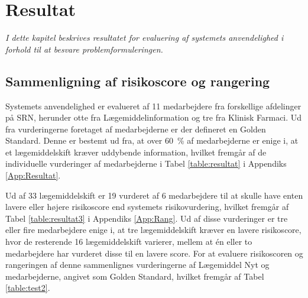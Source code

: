 \chapter{Resultat}
\textit{I dette kapitel beskrives resultatet for evaluering af systemets anvendelighed i forhold til at besvare problemformuleringen.}

\section{Sammenligning af risikoscore og rangering}
Systemets anvendelighed er evalueret af 11 medarbejdere fra forskellige afdelinger på SRN, herunder otte fra Lægemiddelinformation og tre fra Klinisk Farmaci. Ud fra vurderingerne foretaget af medarbejderne er der defineret en Golden Standard. Denne er bestemt ud fra, at over 60~\% af medarbejderne er enige i, at et lægemiddelskift kræver uddybende information, hvilket fremgår af de individuelle vurderinger af medarbejderne i Tabel \ref{table:resultat} i Appendiks \ref{App:Resultat}.

Ud af 33 lægemiddelskift er 19 vurderet af 6 medarbejdere til at skulle have enten lavere eller højere risikoscore end systemets risikovurdering, hvilket fremgår af Tabel \ref{table:resultat3} i Appendiks \ref{App:Rang}. Ud af disse vurderinger er tre eller fire medarbejdere enige i, at tre lægemiddelskift kræver en lavere risikoscore, hvor de resterende 16 lægemiddelskift varierer, mellem at én eller to medarbejdere har vurderet disse til en lavere score. %
For at evaluere risikoscoren og rangeringen af denne sammenlignes vurderingerne af Lægemiddel Nyt og medarbejderne, angivet som Golden Standard, hvilket fremgår af Tabel \ref{table:test2}. 


